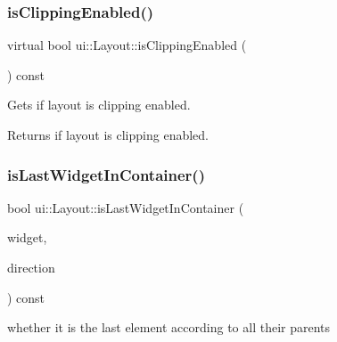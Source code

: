 \subsubsection{\texorpdfstring{is\+Clipping\+Enabled()}{isClippingEnabled()}\hspace{0.1cm}{\footnotesize\ttfamily [2/2]}}
{\footnotesize\ttfamily virtual bool ui\+::\+Layout\+::is\+Clipping\+Enabled (\begin{DoxyParamCaption}{ }\end{DoxyParamCaption}) const\hspace{0.3cm}{\ttfamily [virtual]}}

Gets if layout is clipping enabled.

\begin{DoxyReturn}{Returns}
if layout is clipping enabled. 
\end{DoxyReturn}
\mbox{\label{classui_1_1Layout_a9e1c7e418530e4aab91e387af02afd41}} 
\subsubsection{\texorpdfstring{is\+Last\+Widget\+In\+Container()}{isLastWidgetInContainer()}\hspace{0.1cm}{\footnotesize\ttfamily [1/2]}}
{\footnotesize\ttfamily bool ui\+::\+Layout\+::is\+Last\+Widget\+In\+Container (\begin{DoxyParamCaption}\item[{\hyperlink{classui_1_1Widget}{Widget} $\ast$}]{widget,  }\item[{\hyperlink{classui_1_1Widget_a8ae8e8fc793a04a87584205cd1e8a8a5}{Focus\+Direction}}]{direction }\end{DoxyParamCaption}) const\hspace{0.3cm}{\ttfamily [protected]}}

whether it is the last element according to all their parents \mbox{\label{classui_1_1Layout_a9e1c7e418530e4aab91e387af02afd41}} 
